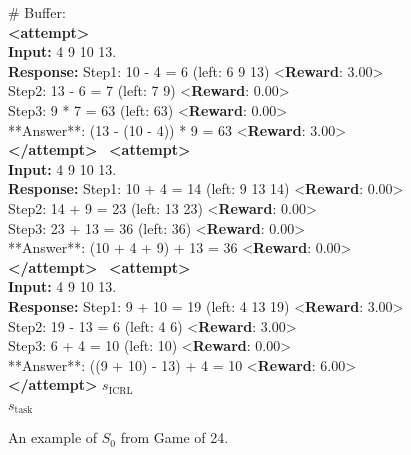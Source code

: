 \documentclass{article}
\newcommand{\0}{\mathbf{0}}
\newcommand{\icrl}{\text{ICRL}}
\newcommand{\task}{\text{task}}
\begin{document}
\begin{figure}[H]
  \centering
  \begin{tcolorbox}[
      colback=gray!5!white,
      colframe=black!100!black,
      width=1\textwidth
  ]
  \small
  {\color{red} \# Buffer:} \\
  \textbf{<attempt>}\\
  \textbf{Input:} 4 9 10 13. \\
  \textbf{Response:}
  Step1: 10 - 4 = 6 (left: 6 9 13) \quad<\textbf{Reward}: 3.00>\\ Step2: 13 - 6 = 7 (left: 7 9) \quad<\textbf{Reward}: 0.00> \\Step3: 9 * 7 = 63 (left: 63)  \quad <\textbf{Reward}: 0.00> \\**Answer**: (13 - (10 - 4)) * 9  = 63 \quad<\textbf{Reward}: 3.00> \\
  \textbf{</attempt>}\
  \vspace{0.8em}
  \textbf{<attempt>}\\
  \textbf{Input:} 4 9 10 13. \\
  \textbf{Response:}
  Step1: 10 + 4 = 14 (left: 9 13 14)
  \quad<\textbf{Reward}: 0.00> \\ Step2: 14 + 9 = 23 (left: 13 23) \quad<\textbf{Reward}: 0.00> \\Step3: 23 + 13 = 36 (left: 36)   \quad <\textbf{Reward}: 0.00> \\**Answer**: (10 + 4 + 9) + 13 = 36 \quad<\textbf{Reward}: 0.00> \\
  \textbf{</attempt>}\
  \vspace{0.8em}
  \textbf{<attempt>}\\
  \textbf{Input:} 4 9 10 13. \\
  \textbf{Response:}
  Step1: 9 + 10 = 19 (left: 4 13 19) \quad<\textbf{Reward}: 3.00>\\ Step2: 19 - 13 = 6 (left: 4 6)  \quad<\textbf{Reward}: 3.00> \\Step3: 6 + 4 = 10 (left: 10)   \quad <\textbf{Reward}: 0.00> \\**Answer**: ((9 + 10) - 13) + 4 = 10 \quad<\textbf{Reward}: 6.00> \\
  \textbf{</attempt>}
  \textbf{\color{red}$s_\icrl$} \\
  \textbf{\color{red}$s_\task$}
  \end{tcolorbox}
  \caption{An example of $S_0$ from Game of 24.}
  \label{fig:incontext_rl_setup}
\end{figure}
\end{document}
